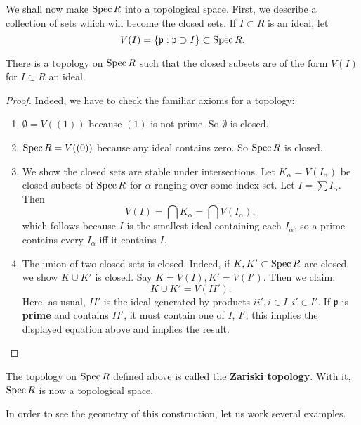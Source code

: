We shall now make $\operatorname{Spec} R$ into a topological space. First, we
describe a
collection of sets which will become the closed sets. 
If $I \subset R$ is an ideal, let
\[ V(I) = \left\{\mathfrak{p}: \mathfrak{p} \supset I\right\}
\subset \operatorname{Spec} R.
\]

\begin{proposition} 
There is a topology on $\operatorname{Spec} R$ such that the closed subsets
are of the form
$V(I)$ for $I \subset R$ an ideal.
\end{proposition} 

\begin{proof} 
Indeed, we have to check the familiar axioms for a topology:
\begin{enumerate}
\item $\emptyset = V((1))$ because $(1)$ is not prime. So
$\emptyset$ is closed.
\item $\operatorname{Spec} R = V((0))$ because any ideal contains zero. So
$\operatorname{Spec} R$ is
closed.
\item We show the closed sets are stable under intersections.
Let
$K_{\alpha} = V(I_{\alpha})$ be closed subsets of $\operatorname{Spec} R$ for
$\alpha$
ranging over some index set.  Let $I
= \sum I_{\alpha}$. Then 
\[ V(I) = \bigcap K_{\alpha} = \bigcap V(I_{\alpha}),  \]
which follows because $I$ is the smallest ideal containing each
$I_{\alpha}$,
so a prime contains every $I_{\alpha}$ iff it contains $I$.  
\item The union of two closed sets is closed. Indeed, if $K,K'
\subset \operatorname{Spec}
R$ are closed, we show $K \cup K'$ is closed. Say $K= V(I), K' =
V(I')$. Then
we claim: 
\[ K \cup K'  = V(II').  \]
Here, as usual, $II'$ is the ideal generated by products $ii', i \in I, i'
\in I'$. If
$\mathfrak{p}$ is \textbf{prime} and contains $II'$, it must
contain one of $I$, $I'$;
this implies the displayed equation above and implies the
result.
\end{enumerate}
\end{proof} 
\begin{definition} 
The topology on $\operatorname{Spec} R$ defined above is called the
\textbf{Zariski
topology}. With it,  $\operatorname{Spec} R$ is now a topological space.
\end{definition} 

In order to see the geometry of this construction, let us work
several examples.

